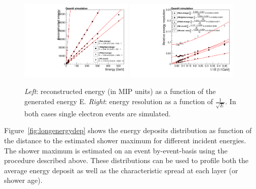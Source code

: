 \begin{figure}[h!]
  \begin{center}
   \includegraphics[width=0.48\textwidth]{figures/e_calibFit}
    \includegraphics[width=0.48\textwidth]{figures/e_resoFit}
    \caption{{\em Left}: reconstructed energy (in MIP units) as a function of the generated
      energy E. {\em Right}: energy resolution as a function of
      $\frac{1}{\sqrt{E}}$. In both cases single electron events are simulated.}
    \label{fig:baselinelinandresol}
  \end{center}
\end{figure}


Figure~\ref{fig:longenergydep} shows the energy deposits distribution
as function of the distance to the estimated shower maximum for
different incident energies. The shower maximum is estimated on an
event by-event-basis using the procedure described above.
These distributions can be used to
profile both the average energy deposit 
as well as the characteristic spread at each layer (or shower age).

